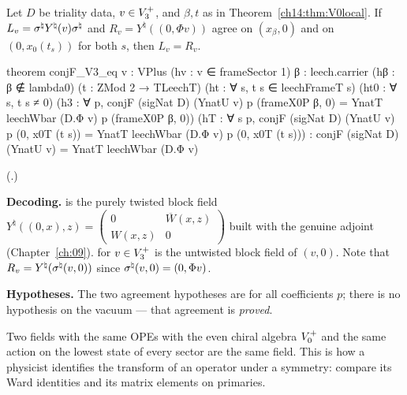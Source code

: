 \begin{theorem}\label{ch14:thm:conjV3}
Let $D$ be triality data, $v\in V_3^{+}$, and $\beta,t$ as in Theorem~\ref{ch14:thm:V0local}.  If
$L_v=\sigma^{\natural} Y^\natural(v)\sigma^{\natural}$ and $R_v=Y^\natural((0,\Phi v))$ agree on $(x_\beta,0)$ and on
$(0,x_0(t_s))$ for both $s$, then $L_v=R_v$.
\end{theorem}
\begin{leancode}
theorem conjF_V3_eq {v : VPlus} (hv : v ∈ frameSector 1) {β : leech.carrier} (hβ : β ∉ lambda0)
    (t : ZMod 2 → TLeechT) (ht : ∀ s, t s ∈ leechFrameT s) (ht0 : ∀ s, t s ≠ 0)
    (h3 : ∀ p, conjF (sigNat D) (YnatU v) p (frameX0P β, 0) = YnatT leechWbar (D.Φ v) p (frameX0P β, 0))
    (hT : ∀ s p, conjF (sigNat D) (YnatU v) p (0, x0T (t s)) = YnatT leechWbar (D.Φ v) p (0, x0T (t s))) :
    conjF (sigNat D) (YnatU v) = YnatT leechWbar (D.Φ v)
\end{leancode}
(.)

\begin{dictionary}
\textbf{Decoding.}   is the purely twisted block field
$Y^\natural((0,x),z)=\begin{pmatrix}0&\overline W(x,z)\\W(x,z)&0\end{pmatrix}$ built with the genuine
adjoint  (Chapter~\ref{ch:09}).   for $v\in V_3^{+}$ is the untwisted block
field of $(v,0)$.  Note that $R_v=Y^\natural(\sigma^{\natural}(v,0))$ since $\sigma^{\natural}(v,0)=(0,\Phi v)$.

\textbf{Hypotheses.}  The two agreement hypotheses are for all coefficients $p$; there is no
hypothesis on the vacuum — that agreement is \emph{proved}.
\end{dictionary}
\begin{physics}
Two fields with the same OPEs with the even chiral algebra $V_0^{+}$ and the same action on the
lowest state of every sector are the same field.  This is how a physicist identifies the transform
of an operator under a symmetry: compare its Ward identities and its matrix elements on primaries.
\end{physics}


